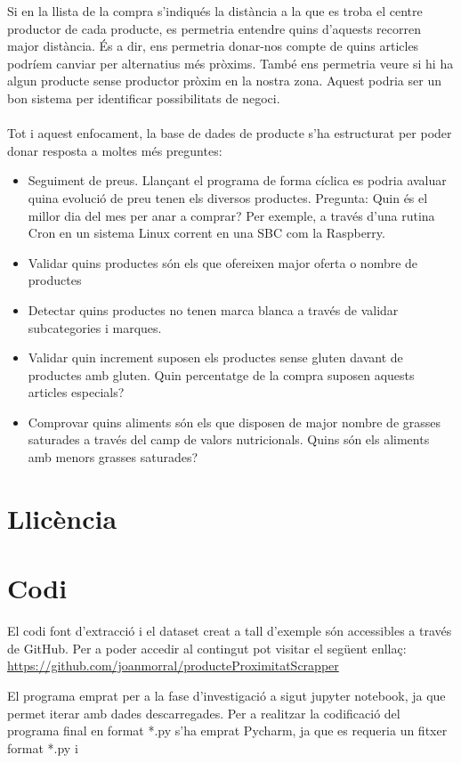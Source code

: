 \documentclass[]{scrartcl}
\begin{document}
Si en la llista de la compra s'indiqués la distància a la que es troba el centre productor de cada producte, es permetria entendre quins d'aquests recorren major distància. És a dir, ens permetria donar-nos compte de quins articles podríem canviar per alternatius més pròxims.
També ens permetria veure si hi ha algun producte sense productor pròxim en la nostra zona. Aquest podria ser un bon sistema per identificar possibilitats de negoci.
\\\\
Tot i aquest enfocament, la base de dades de producte s'ha estructurat per poder donar resposta a moltes més preguntes:
\begin{itemize}
	\item Seguiment de preus. Llançant el programa de forma cíclica es podria avaluar quina evolució de preu tenen els diversos productes. Pregunta: Quin és el millor dia del mes per anar a comprar? Per exemple, a través d'una rutina Cron en un sistema Linux corrent en una SBC com la Raspberry.
	\item Validar quins productes són els que ofereixen major oferta o nombre de productes
	\item Detectar quins productes no tenen marca blanca a través de validar subcategories i marques.
	\item Validar quin increment suposen els productes sense gluten davant de productes amb gluten. Quin percentatge de la compra suposen aquests articles especials?
	\item Comprovar quins aliments són els que disposen de major nombre de grasses saturades a través del camp de valors nutricionals. Quins són els aliments amb menors grasses saturades?
\end{itemize} 

\section{Llicència}

\section{Codi}
El codi font d'extracció i el dataset creat a tall d'exemple són accessibles a través de GitHub. Per a poder accedir al contingut pot visitar el següent enllaç:
\url{https://github.com/joanmorral/producteProximitatScrapper} 

El programa emprat per a la fase d'investigació a sigut jupyter notebook, ja que permet iterar amb dades descarregades.
Per a realitzar la codificació del programa final en format *.py s'ha emprat Pycharm, ja que es requeria un fitxer format *.py i  
\end{document}
